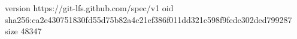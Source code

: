 version https://git-lfs.github.com/spec/v1
oid sha256:ca2e430751830fd55d75b82a4c21ef386f011dd321c598f9fedc302ded799287
size 48347
